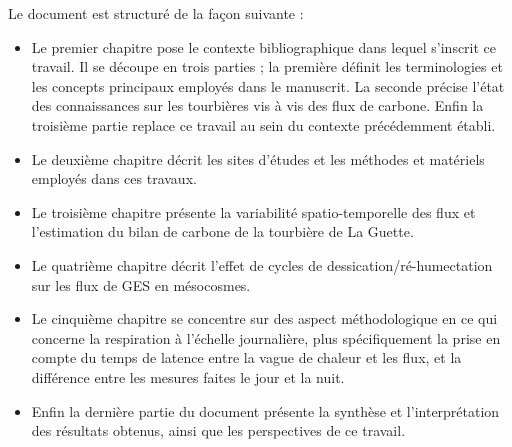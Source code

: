 Le document est structuré de la façon suivante :
\begin{itemize}
\item Le premier chapitre pose le contexte bibliographique dans lequel s'inscrit ce travail.
Il se découpe en trois parties ; la première définit les terminologies et les concepts principaux employés dans le manuscrit.
La seconde précise l'état des connaissances sur les tourbières vis à vis des flux de carbone.
Enfin la troisième partie replace ce travail au sein du contexte précédemment établi.
\item Le deuxième chapitre décrit les sites d'études et les méthodes et matériels employés dans ces travaux.
\item Le troisième chapitre présente la variabilité spatio-temporelle des flux et l'estimation du bilan de carbone de la tourbière de La Guette.
\item Le quatrième chapitre décrit l'effet de cycles de dessication/ré-humectation sur les flux de GES en mésocosmes.
\item Le cinquième chapitre se concentre sur des aspect méthodologique en ce qui concerne la respiration à l'échelle journalière, plus spécifiquement la prise en compte du temps de latence entre la vague de chaleur et les flux, et la différence entre les mesures faites le jour et la nuit.
\item Enfin la dernière partie du document présente la synthèse et l'interprétation des résultats obtenus, ainsi que les perspectives de ce travail.
\end{itemize}

%
